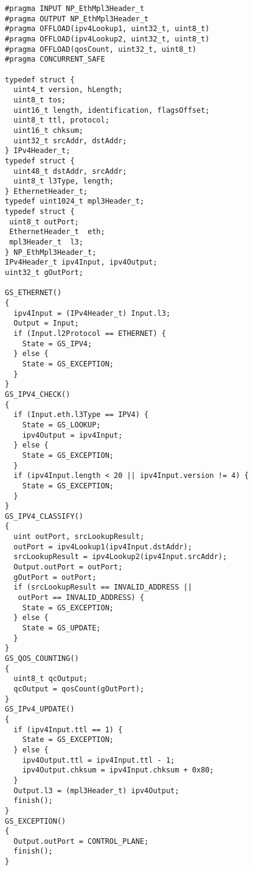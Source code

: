 \footnotesize
\begin{verbatim}
#pragma INPUT NP_EthMpl3Header_t 
#pragma OUTPUT NP_EthMpl3Header_t 
#pragma OFFLOAD(ipv4Lookup1, uint32_t, uint8_t)
#pragma OFFLOAD(ipv4Lookup2, uint32_t, uint8_t)
#pragma OFFLOAD(qosCount, uint32_t, uint8_t)
#pragma CONCURRENT_SAFE 

typedef struct {
  uint4_t version, hLength;
  uint8_t tos;
  uint16_t length, identification, flagsOffset;
  uint8_t ttl, protocol;
  uint16_t chksum;
  uint32_t srcAddr, dstAddr;
} IPv4Header_t;
typedef struct {
  uint48_t dstAddr, srcAddr;
  uint8_t l3Type, length;
} EthernetHeader_t;
typedef uint1024_t mpl3Header_t;
typedef struct {
 uint8_t outPort;
 EthernetHeader_t  eth;
 mpl3Header_t  l3;
} NP_EthMpl3Header_t;
IPv4Header_t ipv4Input, ipv4Output;
uint32_t gOutPort; 

GS_ETHERNET()
{
  ipv4Input = (IPv4Header_t) Input.l3;
  Output = Input;
  if (Input.l2Protocol == ETHERNET) {
    State = GS_IPV4;
  } else { 
    State = GS_EXCEPTION;
  }
}
GS_IPV4_CHECK()
{
  if (Input.eth.l3Type == IPV4) {
    State = GS_LOOKUP;
    ipv4Output = ipv4Input;
  } else { 
    State = GS_EXCEPTION;
  }
  if (ipv4Input.length < 20 || ipv4Input.version != 4) {
    State = GS_EXCEPTION;
  }
}
GS_IPV4_CLASSIFY()
{
  uint outPort, srcLookupResult;
  outPort = ipv4Lookup1(ipv4Input.dstAddr);
  srcLookupResult = ipv4Lookup2(ipv4Input.srcAddr);
  Output.outPort = outPort;
  gOutPort = outPort;
  if (srcLookupResult == INVALID_ADDRESS || 
   outPort == INVALID_ADDRESS) {
    State = GS_EXCEPTION;
  } else {  
    State = GS_UPDATE;
  }
}
GS_QOS_COUNTING() 
{
  uint8_t qcOutput;
  qcOutput = qosCount(gOutPort);
}
GS_IPv4_UPDATE()
{
  if (ipv4Input.ttl == 1) {
    State = GS_EXCEPTION;
  } else {
    ipv4Output.ttl = ipv4Input.ttl - 1; 
    ipv4Output.chksum = ipv4Input.chksum + 0x80; 
  }
  Output.l3 = (mpl3Header_t) ipv4Output;
  finish();
}
GS_EXCEPTION() 
{
  Output.outPort = CONTROL_PLANE;
  finish();
}
\end{verbatim}
\normalsize
